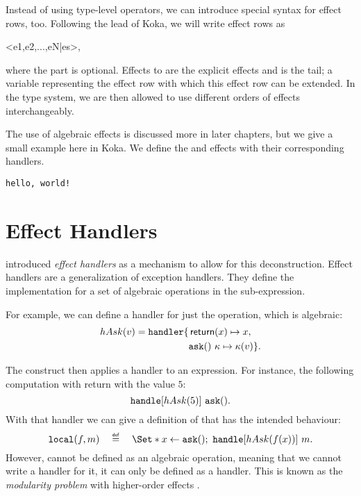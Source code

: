 Instead of using type-level operators, we can introduce special syntax for effect rows, too. Following the lead of Koka\citationneeded, we will write effect rows as
\begin{center}{\ttfamily<e1,e2,...,eN|es>},\end{center}
where the  part is optional. Effects  to  are the explicit effects and  is the tail; a variable representing the effect row with which this effect row can be extended. In the type system, we are then allowed to use different orders of effects interchangeably.

The use of algebraic effects is discussed more in later chapters, but we give a small example here in Koka. We define the  and  effects with their corresponding handlers.

\begin{lstlisting}[language={},style=fancy]
hello, world!
\end{lstlisting}

\section{Effect Handlers}



\textcite{castagna_handlers_2009} introduced \emph{effect handlers} as a mechanism to allow for this deconstruction. Effect handlers are a generalization of exception handlers. They define the implementation for a set of algebraic operations in the sub-expression.

For example, we can define a handler for just the \oask operation, which is algebraic:
\[
    hAsk(v) = \text{\texttt{handler}} \{
        \begin{aligned}[t]
            &\operatorname{\mathsf{return}}(x) \mapsto x, \\
            &\mathtt{ask}()\ \kappa \mapsto \kappa(v) \}.\\
        \end{aligned}
\]

The \handle construct then applies a handler to an expression. For instance, the following computation with return with the value $5$:
\[
    \text{\texttt{handle}}[hAsk(5)]\ \mathtt{ask}().
\]
With that handler we can give a definition of \olocal that has the intended behaviour:
\[
    \olocal(f, m) \quad\defeq\quad \S{x \gets \oask()\seq \handle[hAsk(f(x))]\ m}.
\]
However, \olocal cannot be defined as an algebraic operation, meaning that we cannot write a handler for it, it can only be defined as a handler. This is known as the \emph{modularity problem} with higher-order effects \autocite{wu_effect_2014}.

